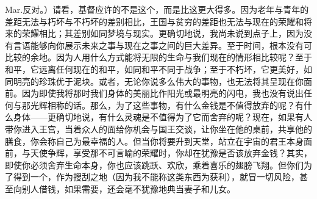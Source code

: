Mar.反对。）请看，基督应许的不是这个，而是比这更大得多。因为老年与青年的差距无法与朽坏与不朽坏的差别相比，王国与贫穷的差距也无法与现在的荣耀和将来的荣耀相比；其差别如同梦境与现实。更确切地说，我尚未说到点子上，因为没有言语能够向你展示未来之事与现在之事之间的巨大差异。至于时间，根本没有可比较的余地。因为人用什么方式能将无限的生命与我们现在的情形相比较呢？至于和平，它远离任何现在的和平，如同和平不同于战争；至于不朽坏，它更美好，如同明亮的珍珠优于泥块。或者，无论你说多么伟大的事物，也无法将其呈现在你面前。因为即使我将那时我们身体的美丽比作阳光或最明亮的闪电，我也没有说出任何与那光辉相称的话。那么，为了这些事物，有什么金钱是不值得放弃的呢？有什么身体——更确切地说，有什么灵魂是不值得为了它而舍弃的呢？现在，如果有人带你进入王宫，当着众人的面给你机会与国王交谈，让你坐在他的桌前，共享他的膳食，你会称自己为最幸福的人。但当你将要升到天堂，站立在宇宙的君王本身面前，与天使争辉，享受那不可言喻的荣耀时，你却在犹豫是否该放弃金钱？其实，即使你必须舍弃生命本身，你也应该跳跃、欢欣，乘着喜乐的翅膀飞翔。但你们为了得到一个，作为搜刮之地（因为我不能称这类东西为获利），就冒一切风险，甚至向别人借钱，如果需要，还会毫不犹豫地典当妻子和儿女。\par

